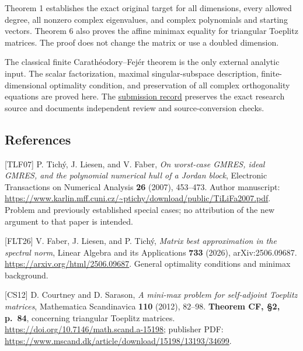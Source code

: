 \documentclass[10pt,a4paper]{article}
\begin{document}
Theorem 1 establishes the exact original target for all dimensions,
every allowed degree, all nonzero complex eigenvalues, and complex
polynomials and starting vectors. Theorem 6 also proves the affine
minimax equality for triangular Toeplitz matrices. The proof does not
change the matrix or use a doubled dimension.

The classical finite Carathéodory--Fejér theorem is the only external
analytic input. The scalar factorization, maximal singular-subspace
description, finite-dimensional optimality condition, and preservation
of all complex orthogonality equations are proved here. The
\href{https://github.com/ajt60gaibb/OpenProblemsInNLA/blob/main/references/stepaniants-ie02-2026-09-11/README.md}{submission
record} preserves the exact research source and documents independent
review and source-conversion checks.


\subsection{References}\label{references}

{[}TLF07{]} P. Tichý, J. Liesen, and V. Faber, \emph{On worst-case
GMRES, ideal GMRES, and the polynomial numerical hull of a Jordan
block}, Electronic Transactions on Numerical Analysis \textbf{26}
(2007), 453--473. Author manuscript:
\url{https://www.karlin.mff.cuni.cz/~ptichy/download/public/TiLiFa2007.pdf}.
Problem and previously established special cases; no attribution of the
new argument to that paper is intended.

{[}FLT26{]} V. Faber, J. Liesen, and P. Tichý, \emph{Matrix best
approximation in the spectral norm}, Linear Algebra and its Applications
\textbf{733} (2026), arXiv:2506.09687.
\url{https://arxiv.org/html/2506.09687}. General optimality conditions
and minimax background.

{[}CS12{]} D. Courtney and D. Sarason, \emph{A mini-max problem for
self-adjoint Toeplitz matrices}, Mathematica Scandinavica \textbf{110}
(2012), 82--98. \textbf{Theorem CF, §2, p.~84}, concerning triangular
Toeplitz matrices. \url{https://doi.org/10.7146/math.scand.a-15198};
publisher PDF:
\url{https://www.mscand.dk/article/download/15198/13193/34699}.
\end{document}
